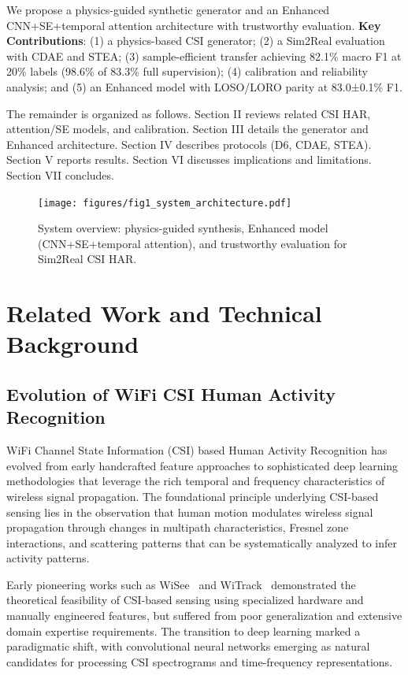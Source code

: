 \documentclass[journal]{IEEEtran}
\begin{document}
We propose a physics-guided synthetic generator and an Enhanced CNN+SE+temporal attention architecture with trustworthy evaluation. \textbf{Key Contributions}: (1) a physics-based CSI generator; (2) a Sim2Real evaluation with CDAE and STEA; (3) sample-efficient transfer achieving 82.1\% macro F1 at 20\% labels (98.6\% of 83.3\% full supervision); (4) calibration and reliability analysis; and (5) an Enhanced model with LOSO/LORO parity at 83.0±0.1\% F1.

The remainder is organized as follows. Section II reviews related CSI HAR, attention/SE models, and calibration. Section III details the generator and Enhanced architecture. Section IV describes protocols (D6, CDAE, STEA). Section V reports results. Section VI discusses implications and limitations. Section VII concludes.

\begin{figure}[t]
\centering
\texttt{[image: figures/fig1\_system\_architecture.pdf]}
\caption{System overview: physics-guided synthesis, Enhanced model (CNN+SE+temporal attention), and trustworthy evaluation for Sim2Real CSI HAR.}
\label{fig:overview}
\end{figure}

\section{Related Work and Technical Background}

\subsection{Evolution of WiFi CSI Human Activity Recognition}

WiFi Channel State Information (CSI) based Human Activity Recognition has evolved from early handcrafted feature approaches to sophisticated deep learning methodologies that leverage the rich temporal and frequency characteristics of wireless signal propagation. The foundational principle underlying CSI-based sensing lies in the observation that human motion modulates wireless signal propagation through changes in multipath characteristics, Fresnel zone interactions, and scattering patterns that can be systematically analyzed to infer activity patterns.

Early pioneering works such as WiSee~\cite{pu2013whole} and WiTrack~\cite{adib2013see} demonstrated the theoretical feasibility of CSI-based sensing using specialized hardware and manually engineered features, but suffered from poor generalization and extensive domain expertise requirements. The transition to deep learning marked a paradigmatic shift, with convolutional neural networks emerging as natural candidates for processing CSI spectrograms and time-frequency representations.
\end{document}
